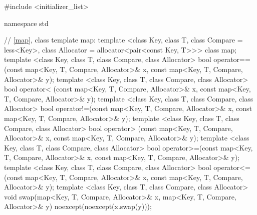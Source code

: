 %
\begin{codeblock}
#include <initializer_list>

namespace std {
  // \ref{map}, class template map:
  template <class Key, class T, class Compare = less<Key>,
            class Allocator = allocator<pair<const Key, T>>>
    class map;
  template <class Key, class T, class Compare, class Allocator>
    bool operator==(const map<Key, T, Compare, Allocator>& x,
                    const map<Key, T, Compare, Allocator>& y);
  template <class Key, class T, class Compare, class Allocator>
    bool operator< (const map<Key, T, Compare, Allocator>& x,
                    const map<Key, T, Compare, Allocator>& y);
  template <class Key, class T, class Compare, class Allocator>
    bool operator!=(const map<Key, T, Compare, Allocator>& x,
                    const map<Key, T, Compare, Allocator>& y);
  template <class Key, class T, class Compare, class Allocator>
    bool operator> (const map<Key, T, Compare, Allocator>& x,
                    const map<Key, T, Compare, Allocator>& y);
  template <class Key, class T, class Compare, class Allocator>
    bool operator>=(const map<Key, T, Compare, Allocator>& x,
                    const map<Key, T, Compare, Allocator>& y);
  template <class Key, class T, class Compare, class Allocator>
    bool operator<=(const map<Key, T, Compare, Allocator>& x,
                    const map<Key, T, Compare, Allocator>& y);
  template <class Key, class T, class Compare, class Allocator>
    void swap(map<Key, T, Compare, Allocator>& x,
              map<Key, T, Compare, Allocator>& y)
      noexcept(noexcept(x.swap(y)));

}
\end{codeblock}
